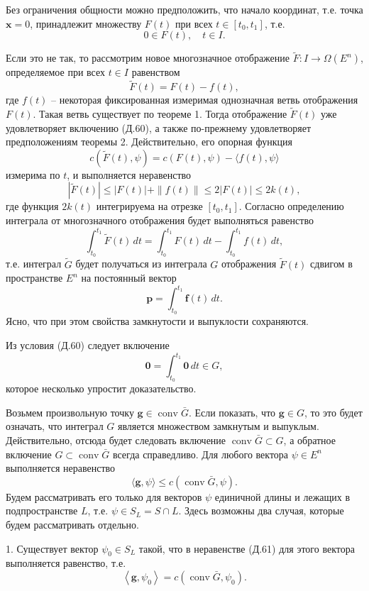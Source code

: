 \documentclass[8pt]{extarticle}
\begin{document}
Без ограничения общности можно предположить, что начало координат, т.е. точка \(\mathbf{x} = 0\), принадлежит множеству \(F(t)\) при всех \(t \in [t_0,t_1]\), т.е.
\[
0 \in F(t), \quad t \in I. \tag{Д.60}
\]

Если это не так, то рассмотрим новое многозначное отображение \(\widetilde{F} : I \rightarrow \Omega\left( E^n \right)\), определяемое при всех \(t \in I\) равенством
\[
\widetilde{F}(t) = F(t) - f(t),
\]
где \(f(t)\) -- некоторая фиксированная измеримая однозначная ветвь отображения \(F(t)\). Такая ветвь существует по теореме 1. Тогда отображение \(\widetilde{F}(t)\) уже удовлетворяет включению (Д.60), а также по-прежнему удовлетворяет предположениям теоремы 2. Действительно, его опорная функция
\[
c\left( \widetilde{F}(t),\psi \right) = c\left( F(t),\psi \right) - \langle f(t),\psi \rangle
\]
измерима по \(t\), и выполняется неравенство
\[
\left| \widetilde{F}(t) \right| \leq \left| F(t) \right| + \|f(t)\| \leq 2\left| F(t) \right| \leq 2k(t),
\]
где функция \(2k(t)\) интегрируема на отрезке \([t_0,t_1]\). Согласно определению интеграла от многозначного отображения будет выполняться равенство
\[
\int_{t_0}^{t_1}\widetilde{F}(t)\,dt = \int_{t_0}^{t_1}F(t)\,dt - \int_{t_0}^{t_1}f(t)\,dt,
\]
т.е. интеграл \(\widetilde{G}\) будет получаться из интеграла \(G\) отображения \(\widetilde{F}(t)\) сдвигом в пространстве \(E^n\) на постоянный вектор
\[
\mathbf{p} = \int_{t_0}^{t_1}\mathbf{f}(t)\,dt.
\]
Ясно, что при этом свойства замкнутости и выпуклости сохраняются.

Из условия (Д.60) следует включение
\[
\mathbf{0} = \int_{t_0}^{t_1}\mathbf{0}\,dt \in G,
\]
которое несколько упростит доказательство.

Возьмем произвольную точку \(\mathbf{g} \in \operatorname{conv}\bar{G}\). Если показать, что \(\mathbf{g} \in G\), то это будет означать, что интеграл \(G\) является множеством замкнутым и выпуклым. Действительно, отсюда будет следовать включение \(\operatorname{conv}\bar{G} \subset G\), а обратное включение \(G \subset \operatorname{conv}\bar{G}\) всегда справедливо. Для любого вектора \(\psi \in E^n\) выполняется неравенство
\[
\langle \mathbf{g},\psi \rangle \leq c\left( \operatorname{conv}\bar{G},\psi \right). \tag{Д.61}
\]
Будем рассматривать его только для векторов \(\psi\) единичной длины и лежащих в подпространстве \(L\), т.е. \(\psi \in S_L = S \cap L\). Здесь возможны два случая, которые будем рассматривать отдельно.

1. Существует вектор \(\psi_0 \in S_L\) такой, что в неравенстве (Д.61) для этого вектора выполняется равенство, т.е.
\[
\left\langle \mathbf{g},\psi_0 \right\rangle = c\left( \operatorname{conv}\bar{G},\psi_0 \right).
\]
\end{document}
